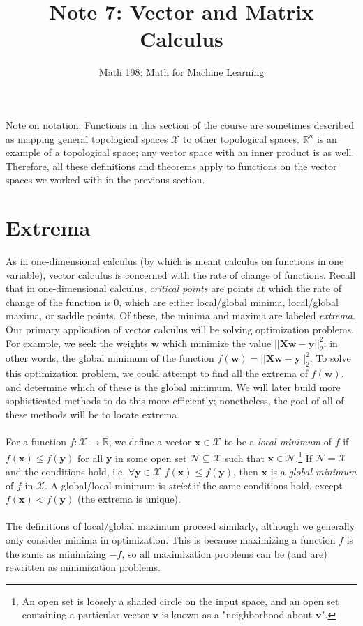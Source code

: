 \documentclass{article}
\title{Note 7: Vector and Matrix Calculus}
\author{Math 198: Math for Machine Learning}
\date{}
\begin{document}
\maketitle

\noindent Note on notation: Functions in this section of the course are sometimes described as mapping general topological spaces $\mathcal{X}$ to other topological spaces. $\mathbb{R}^n$ is an example of a topological space; any vector space with an inner product is as well. Therefore, all these definitions and theorems apply to functions on the vector spaces we worked with in the previous section.

\section{Extrema}
As in one-dimensional calculus (by which is meant calculus on functions in one variable), vector calculus is concerned with the rate of change of functions. Recall that in one-dimensional calculus, \textit{critical points} are points at which the rate of change of the function is 0, which are either local/global minima, local/global maxima, or saddle points. Of these, the minima and maxima are labeled \textit{extrema}. Our primary application of vector calculus will be solving optimization problems. For example, we seek the weights $\mathbf{w}$ which minimize the value $\mathbf{||Xw - y}||_2^2$; in other words, the global minimum of the function $f(\mathbf{w}) = ||\mathbf{Xw - y}||_2^2$. To solve this optimization problem, we could attempt to find all the extrema of $f(\mathbf{w})$, and determine which of these is the global minimum. We will later build more sophisticated methods to do this more efficiently; nonetheless, the goal of all of these methods will be to locate extrema. \\\\
For a function $f: \mathcal{X} \rightarrow \mathbb{R}$, we define a vector $\mathbf{x} \in \mathcal{X}$ to be a \textit{local minimum} of $f$ if $f(\mathbf{x}) \leq f(\mathbf{y})$ for all $\mathbf{y}$ in some open set $\mathcal{N} \subseteq \mathcal{X}$ such that $\mathbf{x} \in \mathcal{N}$.\footnote{An open set is loosely a shaded circle on the input space, and an open set containing a particular vector $\mathbf{v}$ is known as a "neighborhood about $\mathbf{v}$".} If $\mathcal{N} = \mathcal{X}$ and the conditions hold, i.e. $\forall \mathbf{y} \in \mathcal{X}$  $f(\mathbf{x}) \leq f(\mathbf{y})$, then $\mathbf{x}$ is a \textit{global minimum} of $f$ in $\mathcal{X}$. A global/local minimum is \textit{strict} if the same conditions hold, except $f(\mathbf{x}) < f(\mathbf{y})$ (the extrema is unique). \\\\
The definitions of local/global maximum proceed similarly, although we generally only consider minima in optimization. This is because maximizing a function $f$ is the same as minimizing $-f$, so all maximization problems can be (and are) rewritten as minimization problems.
\end{document}
